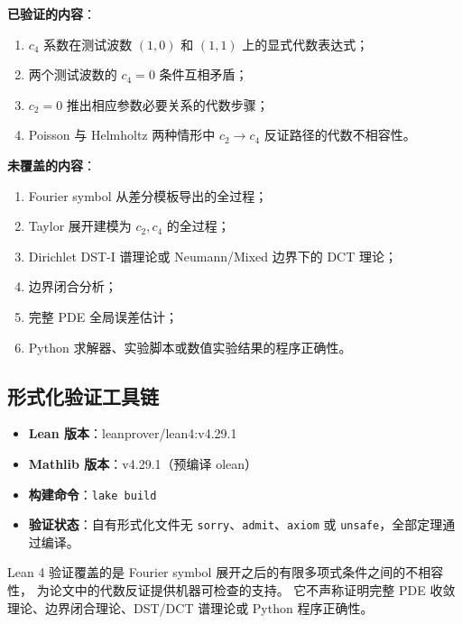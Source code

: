 \textbf{已验证的内容}：
\begin{enumerate}[itemsep=1pt]
  \item \(c_4\) 系数在测试波数 \((1,0)\) 和 \((1,1)\) 上的显式代数表达式；
  \item 两个测试波数的 \(c_4=0\) 条件互相矛盾；
  \item \(c_2=0\) 推出相应参数必要关系的代数步骤；
  \item Poisson 与 Helmholtz 两种情形中 \(c_2 \to c_4\) 反证路径的代数不相容性。
\end{enumerate}

\textbf{未覆盖的内容}：
\begin{enumerate}[itemsep=1pt]
  \item Fourier symbol 从差分模板导出的全过程；
  \item Taylor 展开建模为 \(c_2,c_4\) 的全过程；
  \item Dirichlet DST-I 谱理论或 Neumann/Mixed 边界下的 DCT 理论；
  \item 边界闭合分析；
  \item 完整 PDE 全局误差估计；
  \item Python 求解器、实验脚本或数值实验结果的程序正确性。
\end{enumerate}

\subsection{形式化验证工具链}

\begin{itemize}[itemsep=2pt]
  \item \textbf{Lean 版本}：leanprover/lean4:v4.29.1
  \item \textbf{Mathlib 版本}：v4.29.1（预编译 olean）
  \item \textbf{构建命令}：\texttt{lake build}
  \item \textbf{验证状态}：自有形式化文件无 \texttt{sorry}、\texttt{admit}、\texttt{axiom} 或 \texttt{unsafe}，全部定理通过编译。
\end{itemize}

\begin{remark}
  Lean 4 验证覆盖的是 Fourier symbol 展开之后的有限多项式条件之间的不相容性，
  为论文中的代数反证提供机器可检查的支持。
  它不声称证明完整 PDE 收敛理论、边界闭合理论、DST/DCT 谱理论或 Python 程序正确性。
\end{remark}
